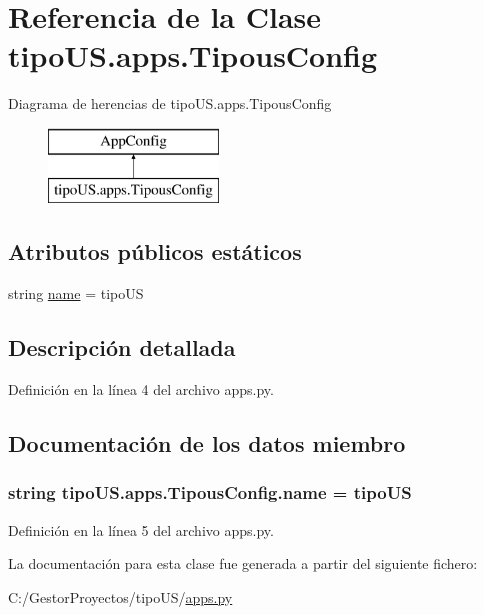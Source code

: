 \hypertarget{classtipo_u_s_1_1apps_1_1_tipous_config}{}\section{Referencia de la Clase tipo\+U\+S.\+apps.\+Tipous\+Config}
\label{classtipo_u_s_1_1apps_1_1_tipous_config}
Diagrama de herencias de tipo\+U\+S.\+apps.\+Tipous\+Config\begin{figure}[H]
\begin{center}
\leavevmode
\includegraphics[height=2.000000cm]{classtipo_u_s_1_1apps_1_1_tipous_config}
\end{center}
\end{figure}
\subsection*{Atributos públicos estáticos}
\begin{DoxyCompactItemize}
\item 
string \hyperlink{classtipo_u_s_1_1apps_1_1_tipous_config_a7b873e4e1d9eb695f5045d784b1e5540}{name} = \textquotesingle{}tipo\+US\textquotesingle{}
\end{DoxyCompactItemize}


\subsection{Descripción detallada}


Definición en la línea 4 del archivo apps.\+py.



\subsection{Documentación de los datos miembro}
\subsubsection[{\texorpdfstring{name}{name}}]{\setlength{\rightskip}{0pt plus 5cm}string tipo\+U\+S.\+apps.\+Tipous\+Config.\+name = \textquotesingle{}tipo\+US\textquotesingle{}\hspace{0.3cm}{\ttfamily [static]}}\hypertarget{classtipo_u_s_1_1apps_1_1_tipous_config_a7b873e4e1d9eb695f5045d784b1e5540}{}\label{classtipo_u_s_1_1apps_1_1_tipous_config_a7b873e4e1d9eb695f5045d784b1e5540}


Definición en la línea 5 del archivo apps.\+py.



La documentación para esta clase fue generada a partir del siguiente fichero\+:\begin{DoxyCompactItemize}
\item 
C\+:/\+Gestor\+Proyectos/tipo\+U\+S/\hyperlink{tipo_u_s_2apps_8py}{apps.\+py}\end{DoxyCompactItemize}
